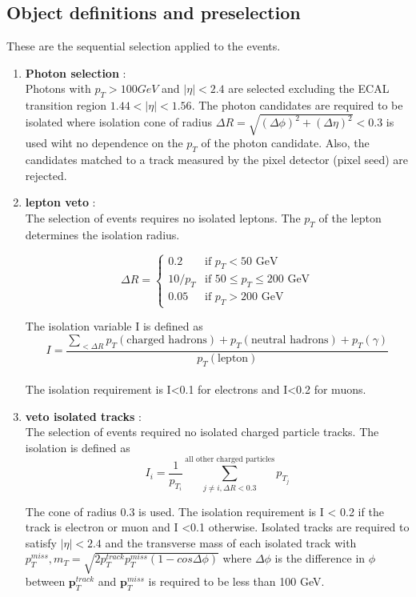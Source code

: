 \documentclass[a4paper, 10pt]{article}
\renewcommand{\vec}[1]{\mathbf{#1}}
\begin{document}
\subsection{Object definitions and preselection}
These are the sequential selection applied to the events. 

\begin{enumerate}
\item \textbf{Photon selection} : \\ 
Photons with $p_{T} > 100 GeV$ and $|\eta| < 2.4$ are selected excluding the ECAL transition region $1.44 < |\eta| < 1.56$. The photon candidates are required to be isolated where isolation cone of radius $\Delta R = \sqrt{(\Delta\phi)^{2} + (\Delta\eta)^{2}} < 0.3$ is used wiht no dependence on the $p_{T}$ of the photon candidate. Also, the candidates matched to a track measured by the pixel detector (pixel seed) are rejected. 

\item \textbf{lepton veto} : \\
The selection of events requires no isolated leptons. The $p_{T}$ of the lepton determines the isolation radius. 
 
\[
  \Delta R =
  \begin{cases}
                                   0.2 & \text{if $p_T < 50$ GeV} \\
                                   10/p_T & \text{if $50 \leq p_T \leq 200$ GeV} \\
                                   0.05 & \text{if $p_T>200$ GeV}
  \end{cases}
\]

The isolation variable I is defined as
$$ I = \frac{\sum_{<\Delta R}p_{T}(\text{charged hadrons}) + p_{T}(\text{neutral hadrons}) + p_{T}(\gamma) }{p_{T} (\text {lepton})} $$
\\
The isolation requirement is I<0.1 for electrons and I<0.2 for muons. 

\item \textbf{veto isolated tracks} : \\
The selection of events required no isolated charged particle tracks. The isolation is defined as 
$$ I_{i} = \frac{1}{p_{T_i}}\sum_{j \neq i, \Delta R < 0.3}^{\text{all other charged particles}} p_{T_j} $$

The cone of radius 0.3 is used. The isolation requirement is I < 0.2 if the track is electron or muon and I <0.1 otherwise. Isolated tracks are required to satisfy $|\eta| < 2.4$ and the transverse mass of each isolated track with $p_{T}^{miss}, m_{T} = \sqrt{2p_{T}^{track}p_{T}^{miss}(1-cos\Delta\phi)}$ where $\Delta\phi$ is the difference in $\phi$ between $\vec{p}_{T}^{track}$ and $\vec{p}_{T}^{miss}$ is required to be less than 100 GeV. 


\end{enumerate}
\end{document}
